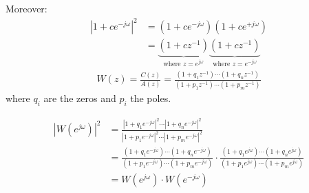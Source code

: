 
Moreover:
\begin{align*}
	|1+c e^{-j \omega}|^2&=\left(1+c e^{-j \omega}\right)\left(1+c e^{+j \omega}\right)\\
	&=\underbrace{\left(1+c z^{-1}\right)}_\text{where $z=e^{j \omega}$}\underbrace{\left(1+c z^{-1}\right)}_\text{where $z=e^{-j \omega}$}
\end{align*}
\begin{align*}
	W(z)=\frac{C(z)}{A(z)}=\frac{(1+q_1z^{-1})\cdots(1+q_nz^{-1})}{(1+p_1z^{-1})\cdots(1+p_mz^{-1})}
\end{align*}
where $q_i$ are the zeros and $p_i$ the poles.

\begin{align*}
	\left|W\left(e^{j \omega}\right)\right|^{2}&=\frac{|1+q_1e^{-j \omega}|^2\cdots|1+q_ne^{-j \omega}|^2}{|1+p_1e^{-j \omega}|^2\cdots|1+p_me^{-j \omega}|^2}\\
	&=\frac{(1+q_1e^{-j \omega})\cdots(1+q_ne^{-j \omega})}{(1+p_1e^{-j \omega})\cdots(1+p_me^{-j \omega})}\cdot\frac{(1+q_1e^{j \omega})\cdots(1+q_ne^{j \omega})}{(1+p_1e^{j \omega})\cdots(1+p_me^{j \omega})}\\
			&=W\left(e^{j \omega}\right)\cdot W\left(e^{-j \omega}\right)
\end{align*}